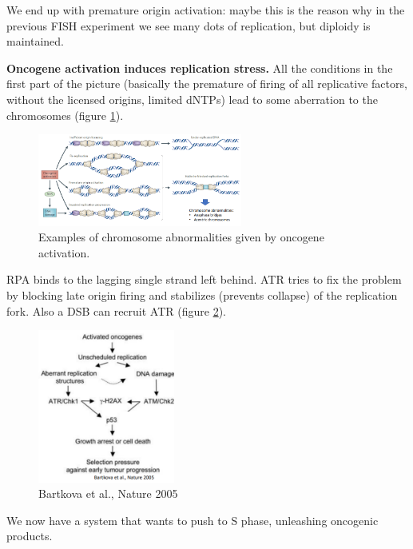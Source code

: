 We end up with premature origin activation: maybe this is the reason why in
the previous FISH experiment we see many dots of replication, but
diploidy is maintained.

\textbf{Oncogene activation induces replication stress.} All the conditions in the first part of the picture (basically the premature of firing of all replicative factors, without the licensed origins, limited dNTPs) lead to some aberration to the chromosomes (figure \ref{fig:aber}).

\begin{figure}[H]
\centering
\includegraphics[width=0.6\textwidth]{../_resources/212276fa882f51c9df6ee225d31e5bae.png} 
\caption{Examples of chromosome abnormalities given by oncogene activation.}
\label{fig:aber}
\end{figure}

RPA binds to the lagging single strand left behind. 
ATR tries to fix the problem by blocking late origin firing and stabilizes (prevents collapse) of the replication fork. Also a DSB can recruit ATR (figure \ref{fig:bartkova}).

\begin{figure}[H]
\centering
\includegraphics[width=0.4\textwidth]{../_resources/13c8849fd53903e2747fc9cc1a31fa57.png}  
\caption{Bartkova et al., Nature 2005}
\label{fig:bartkova}
\end{figure}

We now have a system that wants to push to S phase, unleashing oncogenic
products.

